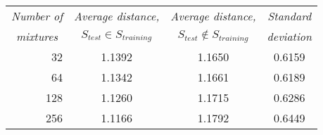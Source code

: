 \begin{table}[htbp]
	\begin{center}
		\label{tab:accuracy_comparison_40k}	
		\begin{tabular}{r|c|cc}
			\toprule
			\multicolumn{1}{c}{\emph{Number of}} & \multicolumn{1}{c}{\emph{Average distance,}} & \multicolumn{1}{c}{\emph{Average distance,}} & \multicolumn{1}{c}{\emph{Standard}} \\
		\multicolumn{1}{c}{\emph{mixtures}}	& \multicolumn{1}{c}{$S_{test}\in S_{training}$} & \multicolumn{1}{c}{$S_{test}\notin S_{training}$} & \multicolumn{1}{c}{\emph{deviation}}\\
			\midrule
			32 & 1.1392 & 1.1650 & 0.6159\\
			64 & 1.1342 & 1.1661 & 0.6189\\
			128 & 1.1260 & 1.1715 & 0.6286\\
			256 & 1.1166 & 1.1792 & 0.6449\\
			\bottomrule			
		\end{tabular}		
	\end{center}
\end{table}



